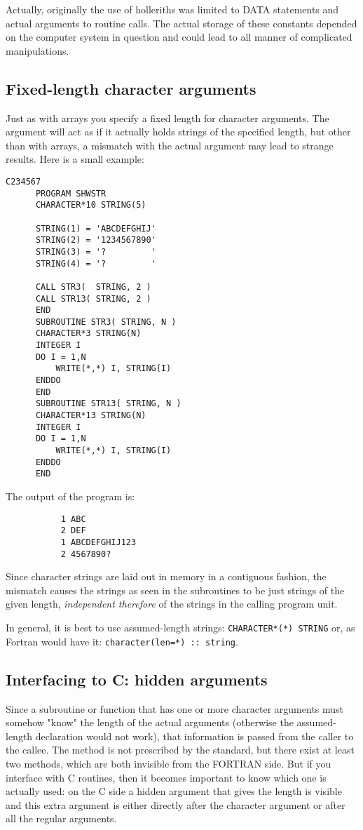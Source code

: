 Actually, originally the use of holleriths was limited to DATA statements
and actual arguments to routine calls. The actual storage of these constants
depended on the computer system in question and could lead to all manner of
complicated manipulations.


\subsection{Fixed-length character arguments}
Just as with arrays you specify a fixed length for character arguments. The argument will act as if it actually
holds strings of the specified length, but other than with arrays, a mismatch with the actual argument may lead
to strange results. Here is a small example:
\begin{verbatim}
C234567
      PROGRAM SHWSTR
      CHARACTER*10 STRING(5)

      STRING(1) = 'ABCDEFGHIJ'
      STRING(2) = '1234567890'
      STRING(3) = '?         '
      STRING(4) = '?         '

      CALL STR3(  STRING, 2 )
      CALL STR13( STRING, 2 )
      END
      SUBROUTINE STR3( STRING, N )
      CHARACTER*3 STRING(N)
      INTEGER I
      DO I = 1,N
          WRITE(*,*) I, STRING(I)
      ENDDO
      END
      SUBROUTINE STR13( STRING, N )
      CHARACTER*13 STRING(N)
      INTEGER I
      DO I = 1,N
          WRITE(*,*) I, STRING(I)
      ENDDO
      END
\end{verbatim}

The output of the program is:
\begin{verbatim}
           1 ABC
           2 DEF
           1 ABCDEFGHIJ123
           2 4567890?
\end{verbatim}

Since character strings are laid out in memory in a contiguous fashion, the mismatch causes the
strings as seen in the subroutines to be just strings of the given length, \emph{independent therefore}
of the strings in the calling program unit.

In general, it is best to use assumed-length strings: \verb+CHARACTER*(*) STRING+ or, as Fortran
would have it: \verb+character(len=*) :: string+.

\subsection{Interfacing to C: hidden arguments}
Since a subroutine or function that has one or more character arguments must somehow "know" the
length of the actual arguments (otherwise the assumed-length declaration would not work),
that information is passed from the caller to the callee. The method is not prescribed by the
standard, but there exist at least two methods, which are both invisible from the FORTRAN side.
But if you interface with C routines, then it becomes important to know which one is actually
used: on the C side a hidden argument that gives the length is visible and this extra argument
is either directly after the character argument or after all the regular arguments.

